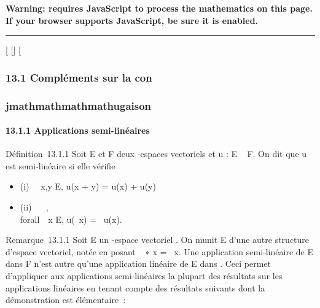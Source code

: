 \textbf{Warning: 
requires JavaScript to process the mathematics on this page.\\ If your
browser supports JavaScript, be sure it is enabled.}

\begin{center}\rule{3in}{0.4pt}\end{center}

{[}
{[}{]}
{[}

\subsubsection{13.1 Compléments sur la con\\\\jmathmathmathmathugaison}

\paragraph{13.1.1 Applications semi-linéaires}

Définition~13.1.1 Soit E et F deux -espaces vectoriels et u : E \rightarrow~ F. On
dit que u est semi-linéaire si elle vérifie

\begin{itemize}
\itemsep1pt\parskip0pt
\item
  (i) \forall~~x,y \in E, u(x + y) = u(x) + u(y)
\item
  (ii) \forall~\lambda~ \in {}, \\forall~~x \in
  E, u(\lambda~x) = \overline\lambda~u(x).
\end{itemize}

Remarque~13.1.1 Soit E un -espace vectoriel . On munit E d'une autre
structure d'espace vectoriel, notée \checkE en posant
\lambda~ ∗ x = \overline\lambda~x. Une application semi-linéaire de
E dans F n'est autre qu'une application linéaire de E dans
\checkF. Ceci permet d'appliquer aux applications
semi-linéaires la plupart des résultats sur les applications linéaires
en tenant compte des résultats suivants dont la démonstration est
élémentaire~:

